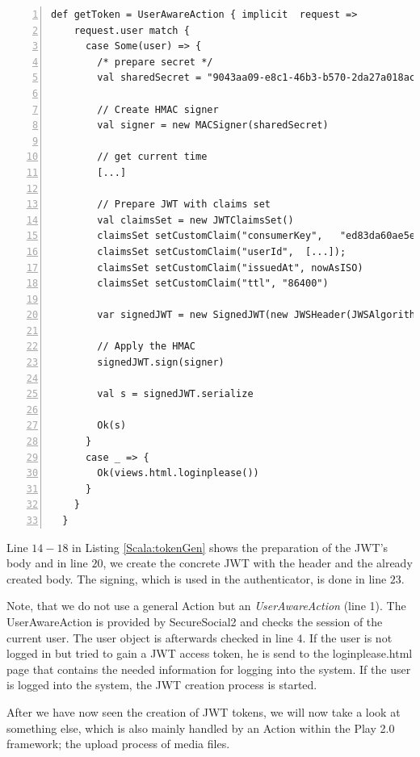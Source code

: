 \begin{lstlisting}[numbers=left,caption={Generation of JWT tokens within the backend},label=Scala:tokenGen,frame=tlbr,breaklines]
def getToken = UserAwareAction { implicit  request =>
    request.user match {
      case Some(user) => {
        /* prepare secret */
        val sharedSecret = "9043aa09-e8c1-46b3-b570-2da27a018ac3" getBytes

        // Create HMAC signer
        val signer = new MACSigner(sharedSecret)

        // get current time
        [...]

        // Prepare JWT with claims set
        val claimsSet = new JWTClaimsSet()
        claimsSet setCustomClaim("consumerKey",   "ed83da60ae5e4d159729eef16a207525")
        claimsSet setCustomClaim("userId",  [...]);
        claimsSet setCustomClaim("issuedAt", nowAsISO)
        claimsSet setCustomClaim("ttl", "86400")

        var signedJWT = new SignedJWT(new JWSHeader(JWSAlgorithm.HS256), claimsSet)

        // Apply the HMAC
        signedJWT.sign(signer)

        val s = signedJWT.serialize

        Ok(s)
      }
      case _ => {
        Ok(views.html.loginplease())
      }
    }
  }
\end{lstlisting}

Line $14-18$ in Listing \ref{Scala:tokenGen} shows the preparation of the JWT's body and in line $20$, we create the concrete JWT with the header and the already created body. The signing, which is used in the authenticator, is done in line $23$. 

Note, that we do not use a general Action but an \emph{UserAwareAction} (line 1).
The UserAwareAction is provided by SecureSocial2 and checks the session of the current user. The user object is afterwards checked in line $4$. If the user is not logged in but tried to gain a JWT access token, he is send to the loginplease.html page that contains the needed information for logging into the system. If the user is logged into the system, the JWT creation process is started.

After we have now seen the creation of JWT tokens, we will now take a look at something else, which is also mainly handled by an Action within the Play 2.0 framework; the upload process of media files. 


